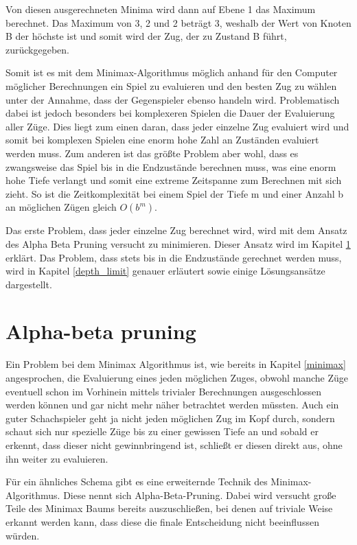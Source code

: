 Von diesen ausgerechneten Minima wird dann auf Ebene 1 das Maximum berechnet. Das Maximum von 3, 2 und 2 beträgt 3, weshalb der Wert von Knoten B der höchste ist und somit wird der Zug, der zu Zustand B führt, zurückgegeben.

Somit ist es mit dem Minimax-Algorithmus möglich anhand für den Computer möglicher Berechnungen ein Spiel zu evaluieren und den besten Zug zu wählen unter der Annahme, dass der Gegenspieler ebenso handeln wird. Problematisch dabei ist jedoch besonders bei komplexeren Spielen die Dauer der Evaluierung aller Züge. Dies liegt zum einen daran, dass jeder einzelne Zug evaluiert wird und somit bei komplexen Spielen eine enorm hohe Zahl an Zuständen evaluiert werden muss. Zum anderen ist das größte Problem aber wohl, dass es zwangsweise das Spiel bis in die Endzustände berechnen muss, was eine enorm hohe Tiefe verlangt und somit eine extreme Zeitspanne zum Berechnen mit sich zieht. So ist die Zeitkomplexität bei einem Spiel der Tiefe m und einer Anzahl b an möglichen Zügen gleich $O(b^m)$. \cite{Russell2010}



Das erste Problem, dass jeder einzelne Zug berechnet wird, wird mit dem Ansatz des Alpha Beta Pruning versucht zu minimieren. Dieser Ansatz wird im Kapitel \ref{alpha_beta} erklärt. Das Problem, dass stets bis in die Endzustände gerechnet werden muss, wird in Kapitel \ref{depth_limit} genauer erläutert sowie einige Lösungsansätze dargestellt.




\section{Alpha-beta pruning}\label{alpha_beta}

Ein Problem bei dem Minimax Algorithmus ist, wie bereits in Kapitel \ref{minimax} angesprochen, die Evaluierung eines jeden möglichen Zuges, obwohl manche Züge eventuell schon im Vorhinein mittels trivialer Berechnungen ausgeschlossen werden können und gar nicht mehr näher betrachtet werden müssten. Auch ein guter Schachspieler geht ja nicht jeden möglichen Zug im Kopf durch, sondern schaut sich nur spezielle Züge bis zu einer gewissen Tiefe an und sobald er erkennt, dass dieser nicht gewinnbringend ist, schließt er diesen direkt aus, ohne ihn weiter zu evaluieren.

Für ein ähnliches Schema gibt es eine erweiternde Technik des Minimax-Algorithmus. Diese nennt sich Alpha-Beta-Pruning. Dabei wird versucht große Teile des Minimax Baums bereits auszuschließen, bei denen auf triviale Weise erkannt werden kann, dass diese die finale Entscheidung nicht beeinflussen würden. 


